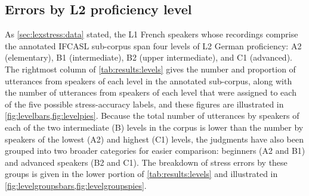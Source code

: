 		
		
		\subsection{Errors by L2 proficiency level}
		\label{sec:results:level}
		
		
		
			
			As \cref{sec:lexstress:data} stated, the L1 French speakers whose recordings comprise the annotated IFCASL sub-corpus span four levels of L2 German proficiency: A2 (elementary), B1 (intermediate), B2 (upper intermediate), and C1 (advanced). The rightmost column of \cref{tab:results:levels} gives the number and proportion of utterances from speakers of each level in the annotated sub-corpus, along with the number of utterances from speakers of each level that were assigned to each of the five possible stress-accuracy labels, and these figures are illustrated in \cref{fig:levelbars,fig:levelpies}. Because the total number of utterances by speakers of each of the two intermediate (B) levels in the corpus is lower than the number by speakers of the lowest (A2) and highest (C1) levels, the judgments have also been grouped into two broader categories for easier comparison: beginners (A2 and B1) and advanced speakers (B2 and C1). The breakdown of stress errors by these groups is given in the lower portion of \cref{tab:results:levels} and illustrated in \cref{fig:levelgroupsbars,fig:levelgroupspies}.
			
			
			

